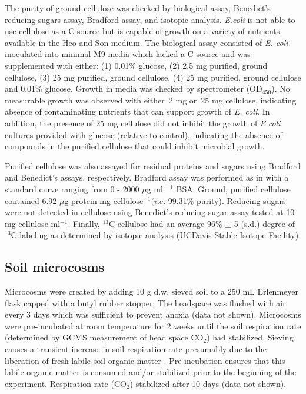 \documentclass{article}
\begin{document}
The purity of ground cellulose was checked by biological assay, Benedict's
reducing sugars assay, Bradford assay, and isotopic analysis. \textit{E.coli}
is not able to use cellulose as a C source but is capable of growth on
a variety of nutrients available in the Heo and Son medium. The biological
assay consisted of \textit{E. coli} inoculated into minimal M9 media which
lacked a C source and was supplemented with either: (1) 0.01\% glucose, (2) 2.5
mg purified, ground cellulose, (3) 25 mg purified, ground cellulose, (4) 25 mg
purified, ground cellulose and 0.01\% glucose. Growth in media was checked by
spectrometer (OD$_{450}$). No measurable growth was observed with either~2 mg
or~25 mg cellulose, indicating absence of contaminating nutrients that can
support growth of \textit{E. coli}. In addition, the presence of 25 mg
cellulose did not inhibit the growth of \textit{E.coli} cultures provided with
glucose (relative to control), indicating the absence of compounds in the
purified cellulose that could inhibit microbial growth.

Purified cellulose was also assayed for residual proteins and sugars using
Bradford and Benedict's assays, respectively. Bradford assay was performed as
in \citep{Bradford_1976} with a standard curve ranging from 0 - 2000 $\mu$g ml
$^{-1}$ BSA. Ground, purified cellulose contained 6.92 $\mu$g protein mg
cellulose$^{-1} (\textit{i.e.}$ 99.31\% purity). Reducing sugars were not
detected in cellulose using Benedict's reducing sugar assay
\citep{benedict1909reagent} tested at 10 mg cellulose ml$^{-1}$. Finally,
$^{13}$C-cellulose had an average 96\% $\pm$
5 (s.d.) degree of $^{13}$C labeling as determined by isotopic analysis
  (UCDavis Stable Isotope Facility).           

\subsection{Soil microcosms}
Microcosms were created by adding 10 g d.w. sieved soil to a 250 mL
Erlenmeyer flask capped with a butyl rubber stopper. The headspace was flushed
with air every 3 days which was sufficient to prevent anoxia (data not shown).
Microcosms were pre-incubated at room temperature for 2 weeks until the soil
respiration rate (determined by GCMS measurement of head space CO$_{2}$) had
stabilized. Sieving causes a transient increase in soil respiration rate
presumably due to the liberation of fresh labile soil organic matter
\citep{Datta_2014}. Pre-incubation ensures that this labile organic matter is
consumed and/or stabilized prior to the beginning of the experiment.
Respiration rate (CO$_{2}$) stabilized after 10 days (data not shown). 
\end{document}

